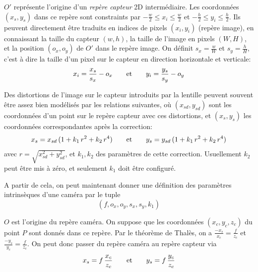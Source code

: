 \documentclass[a4paper,10pt]{scrreprt}
\begin{document}
$O'$ représente l'origine d'un \emph{repère capteur} 2D intermédiaire. Les coordonnées $(x_s, y_s)$ dans ce repère sont constraints par $-\frac{w}{2} \leq x_i \leq \frac{w}{2}$ et $-\frac{h}{2} \leq y_i \leq \frac{h}{2}$. Ils peuvent directement être traduits en indices de pixels $(x_i, y_i)$ (repère image), en connaissant la taille du capteur $(w, h)$, la taille de l'image en pixels $(W, H)$, et la position $(o_x, o_y)$ de $O'$ dans le repère image. On définit $s_x = \frac{w}{W}$ et $s_y = \frac{h}{H}$, c'est à dire la taille d'un pixel sur le capteur en direction horizontale et verticale:
\begin{equation*}
	x_i = \frac{x_s}{s_x} - o_x
	\hspace{7mm} \text{et} \hspace{7mm}
	y_i = \frac{y_s}{s_y} - o_y
\end{equation*}

Des distortions de l'image sur le capteur introduits par la lentille peuvent souvent être assez bien modélisés par les relations suivantes, où $(x_{sd}, y_{sd})$ sont les coordonnées d'un point sur le repère capteur avec ces distortions, et $(x_s, y_s)$ les coordonnées correspondantes après la correction: \cite{Truc1998}
\begin{equation*}
	x_s = x_{sd} \, (1 + k_1 \, r^2 + k_2 \, r^4)
	\hspace{7mm} \text{et} \hspace{7mm}
	y_s = y_{sd} \, (1 + k_1 \, r^2 + k_2 \, r^4)
\end{equation*}
avec $r = \sqrt{x_{sd}^2 + y_{sd}^2}$, et $k_1, k_2$ des paramètres de cette correction. Usuellement $k_2$ peut être mis à zéro, et seulement $k_1$ doit être configuré.

A partir de cela, on peut maintenant donner une définition des paramètres intrinsèques d'une caméra par le tuple
\begin{equation*}
	(f, o_x, o_y, s_x, s_y, k_1)
\end{equation*}

$O$ est l'origine du repère caméra. On suppose que les coordonnées $(x_c, y_c, z_c)$ du point $P$ sont donnés dans ce repère. Par le théorème de Thalès, on a $\frac{-x_s}{x_c} = \frac{f}{z_c}$ et $\frac{-y_s}{y_c} = \frac{f}{z_c}$. On peut donc passer du repère caméra au repère capteur via
\begin{equation*}
	x_s = f \, \frac{x_c}{z_c}
	\hspace{7mm} \text{et} \hspace{7mm}
	y_s = f \, \frac{y_c}{z_c}	
\end{equation*}
\end{document}
